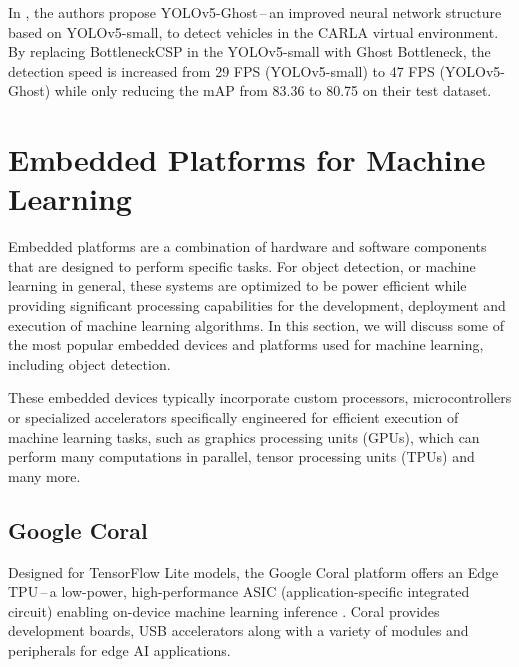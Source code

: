 In \cite{Wu2021}, the authors propose YOLOv5-Ghost\,--\,an improved neural
network structure based on YOLOv5-small, to detect vehicles in the
CARLA virtual environment. By replacing BottleneckCSP in the
YOLOv5-small with Ghost Bottleneck, the detection speed is increased from 29 FPS
(YOLOv5-small) to 47 FPS (YOLOv5-Ghost) while only reducing the mAP from
\num{83.36} to \num{80.75} on their test dataset.














\section{Embedded Platforms for Machine Learning}

Embedded platforms are a combination of hardware and software components that
are designed to perform specific tasks. For object detection, or machine
learning in general, these systems are optimized to be power efficient while
providing significant processing capabilities for the development, deployment and
execution of machine learning algorithms. In this section, we will discuss some
of the most popular embedded devices and platforms used for machine learning,
including object detection.

These embedded devices typically incorporate custom processors, microcontrollers
or specialized accelerators specifically engineered for efficient execution of
machine learning tasks, such as graphics processing units (GPUs), which can
perform many computations in parallel, tensor processing units (TPUs) and many
more.

\subsection{Google Coral}

Designed for TensorFlow Lite  models, the Google Coral platform
offers an Edge TPU\,--\,a low-power, high-performance ASIC (application-specific
integrated circuit) enabling on-device machine learning inference . Coral provides development boards, USB
accelerators along with a variety of modules and peripherals for edge AI
applications.


